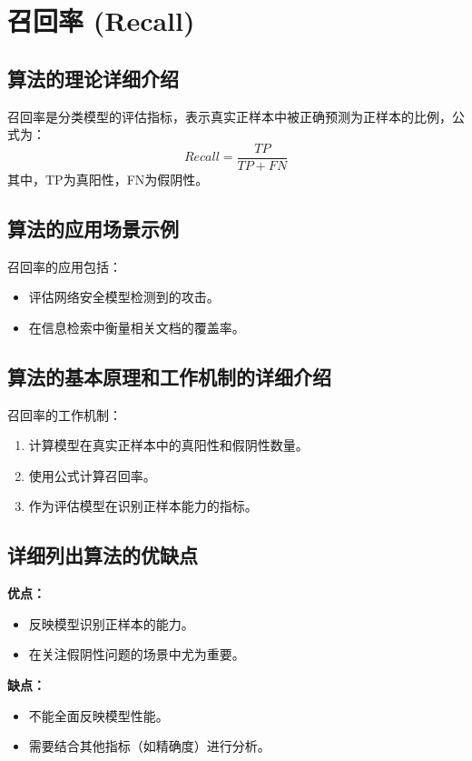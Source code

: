 \section{召回率 (Recall)}
\subsection*{算法的理论详细介绍}
召回率是分类模型的评估指标，表示真实正样本中被正确预测为正样本的比例，公式为：
\[
    Recall = \frac{TP}{TP + FN}
\]
其中，TP为真阳性，FN为假阴性。

\subsection*{算法的应用场景示例}
召回率的应用包括：
\begin{itemize}
    \item 评估网络安全模型检测到的攻击。
    \item 在信息检索中衡量相关文档的覆盖率。
\end{itemize}

\subsection*{算法的基本原理和工作机制的详细介绍}
召回率的工作机制：
\begin{enumerate}
    \item 计算模型在真实正样本中的真阳性和假阴性数量。
    \item 使用公式计算召回率。
    \item 作为评估模型在识别正样本能力的指标。
\end{enumerate}

\subsection*{详细列出算法的优缺点}
\textbf{优点：}
\begin{itemize}
    \item 反映模型识别正样本的能力。
    \item 在关注假阴性问题的场景中尤为重要。
\end{itemize}

\textbf{缺点：}
\begin{itemize}
    \item 不能全面反映模型性能。
    \item 需要结合其他指标（如精确度）进行分析。
\end{itemize}

